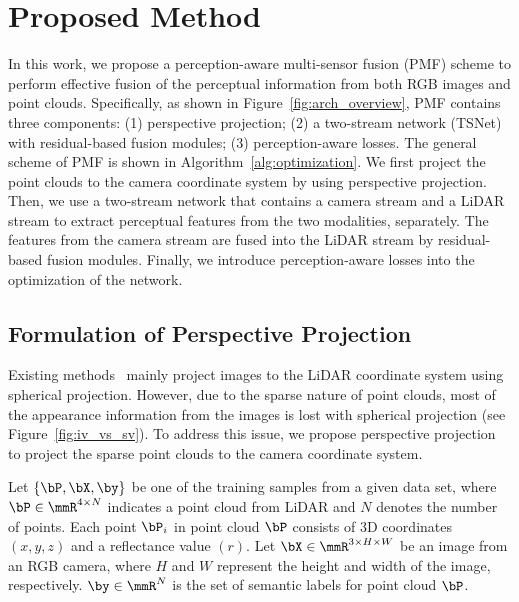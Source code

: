 \documentclass[10pt,twocolumn,letterpaper]{article}
\begin{document}
\section{Proposed Method}


In this work, we propose a perception-aware multi-sensor fusion (PMF) scheme to perform effective fusion of the perceptual information from both RGB images and point clouds. Specifically, as shown in Figure~\ref{fig:arch_overview}, PMF contains three components: (1) perspective projection; (2) a two-stream network (TSNet) with residual-based fusion modules; (3) perception-aware losses. The general scheme of PMF is shown in Algorithm~\ref{alg:optimization}. We first project the point clouds to the camera coordinate system by using perspective projection. Then, we use a two-stream network that contains a camera stream and a LiDAR stream to extract perceptual features from the two modalities, separately. The features from the camera stream are fused into the LiDAR stream by residual-based fusion modules. Finally, we introduce perception-aware losses into the optimization of the network.








\subsection{Formulation of Perspective Projection}
\label{sec:projection}

Existing methods~\cite{Madawy2019RGBAL,vora2020pointpainting} mainly project  images to the LiDAR coordinate system using spherical projection. However, due to the sparse nature of point clouds, most of the appearance information from the images is lost with spherical projection (see Figure~\ref{fig:iv_vs_sv}). To address this issue, we propose perspective projection to project the sparse point clouds to the camera coordinate system.


Let $\{\bP, \bX, \by \}$ be one of the training samples from a given data set, where $\bP \in\mmR^{4\times N}$ indicates a point cloud from LiDAR and $N$ denotes the number of points. Each point $\bP_i$ in point cloud $\bP$ consists of 3D coordinates $(x, y, z)$ and a reflectance value $(r)$. Let $\bX \in \mmR^{3\times H\times W}$ be an image from an RGB camera, where $H$ and $W$ represent the height and width of the image, respectively. $\by\in \mmR^{N}$ is the set of semantic labels for point cloud $\bP$.
\end{document}
